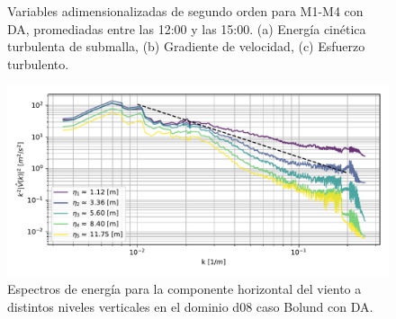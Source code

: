 \begin{figure}[H]
\begin{center}
	\end{center}
	\vspace{-5mm}
	\caption{Variables adimensionalizadas de segundo orden para M1-M4 con DA, promediadas entre las 12:00 y las 15:00. (a) Energía cinética turbulenta de submalla, (b) Gradiente de velocidad, (c) Esfuerzo turbulento. }
	\label{fig:06_bol_da_mean_secondorder}
\end{figure}

\begin{figure}[H]
	\centering
	\includegraphics[width=1.0\linewidth,page=1,trim={3mm 5mm 3mm 3mm},clip]{Imagenes/06/bol_da/spectra}%
	\caption{Espectros de energía para la componente horizontal del viento a distintos niveles verticales en el dominio d08 caso Bolund con DA.}
	\label{fig:06_bol_da_spectrum}
\end{figure}

